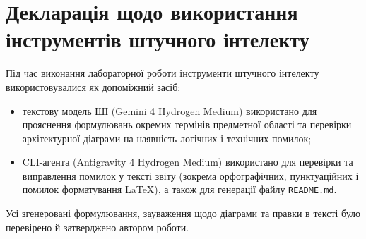\clearpage
{}
\chapter*{Декларація щодо використання інструментів штучного інтелекту}
\label{chapter:conclusion}

Під час виконання лабораторної роботи інструменти штучного інтелекту використовувалися як допоміжний засіб:
\begin{itemize}[wide]
    \item текстову модель ШІ (Gemini 4 Hydrogen Medium) використано для прояснення формулювань окремих термінів предметної області та перевірки архітектурної діаграми на наявність логічних і технічних помилок;
    \item CLI-агента (Antigravity 4 Hydrogen Medium) використано для перевірки та виправлення помилок у тексті звіту (зокрема орфографічних, пунктуаційних і помилок форматування \LaTeX), а також для генерації файлу \texttt{README.md}.
\end{itemize}

Усі згенеровані формулювання, зауваження щодо діаграми та правки в тексті було перевірено й затверджено автором роботи.
